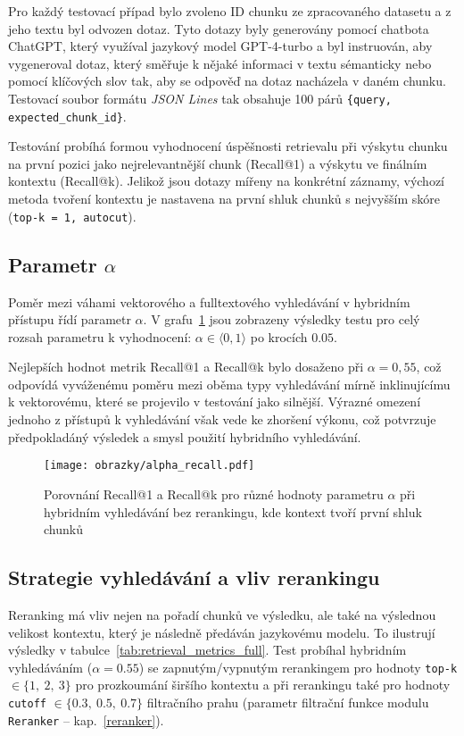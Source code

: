 Pro každý testovací případ bylo zvoleno ID chunku ze zpracovaného datasetu a z jeho textu byl odvozen dotaz. Tyto dotazy byly generovány pomocí chatbota ChatGPT, který využíval jazykový model GPT-4-turbo a byl instruován, aby vygeneroval dotaz, který směřuje k nějaké informaci v textu sémanticky nebo pomocí klíčových slov tak, aby se odpověď na dotaz nacházela v daném chunku. Testovací soubor formátu \textit{JSON Lines} tak obsahuje 100 párů \texttt{\{query, expected\_chunk\_id\}}.

Testování probíhá formou vyhodnocení úspěšnosti retrievalu při výskytu chunku na první pozici jako nejrelevantnější chunk (Recall@1) a výskytu ve finálním kontextu (Recall@k). Jelikož jsou dotazy mířeny na konkrétní záznamy, výchozí metoda tvoření kontextu je nastavena na první shluk chunků s nejvyšším skóre (\texttt{top-k = 1, autocut}).

\subsection{Parametr $\alpha$}
Poměr mezi váhami vektorového a fulltextového vyhledávání v hybridním přístupu řídí parametr $\alpha$. V grafu~\ref{fig:alpha-recall} jsou zobrazeny výsledky testu pro celý rozsah parametru k vyhodnocení: $\alpha \in \langle 0, 1 \rangle$ po krocích $0.05$.

Nejlepších hodnot metrik Recall@1 a Recall@k bylo dosaženo při $\alpha = 0{,}55$, což odpovídá vyváženému poměru mezi oběma typy vyhledávání mírně inklinujícímu k vektorovému, které se projevilo v testování jako silnější. Výrazné omezení jednoho z přístupů k vyhledávání však vede ke zhoršení výkonu, což potvrzuje předpokladáný výsledek a smysl použití hybridního vyhledávání.

\begin{figure}[H]
    \centering
    \texttt{[image: obrazky/alpha\_recall.pdf]}
    \caption{Porovnání Recall@1 a Recall@k pro různé hodnoty parametru $\alpha$ při hybridním vyhledávání bez rerankingu, kde kontext tvoří první shluk chunků }
    \label{fig:alpha-recall}
\end{figure}

\subsection{Strategie vyhledávání a vliv rerankingu}
Reranking má vliv nejen na pořadí chunků ve výsledku, ale také na výslednou velikost kontextu, který je následně předáván jazykovému modelu. To ilustrují výsledky v tabulce~\ref{tab:retrieval_metrics_full}. Test probíhal hybridním vyhledáváním ($\alpha=0.55$) se zapnutým/vypnutým rerankingem pro hodnoty \texttt{top-k} $\in \{1,\  2,\ 3\}$ pro prozkoumání širšího kontextu a při rerankingu také pro hodnoty \texttt{cutoff} $\in \{0.3,\ 0.5,\ 0.7\}$ filtračního prahu (parametr filtrační funkce modulu \texttt{Reranker} – kap.~\ref{reranker}). 

